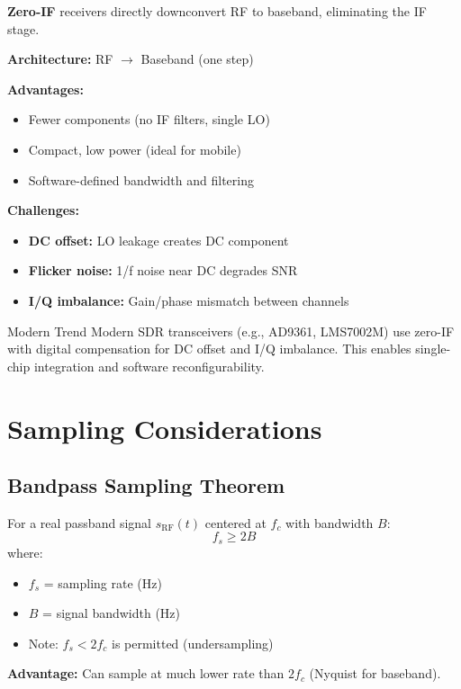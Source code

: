 \textbf{Zero-IF} receivers directly downconvert RF to baseband, eliminating the IF stage.

\textbf{Architecture:} RF $\rightarrow$ Baseband (one step)

\textbf{Advantages:}
\begin{itemize}
\item Fewer components (no IF filters, single LO)
\item Compact, low power (ideal for mobile)
\item Software-defined bandwidth and filtering
\end{itemize}

\textbf{Challenges:}
\begin{itemize}
\item \textbf{DC offset:} LO leakage creates DC component
\item \textbf{Flicker noise:} 1/f noise near DC degrades SNR
\item \textbf{I/Q imbalance:} Gain/phase mismatch between channels
\end{itemize}

\begin{calloutbox}{Modern Trend}
Modern SDR transceivers (e.g., AD9361, LMS7002M) use zero-IF with digital compensation for DC offset and I/Q imbalance. This enables single-chip integration and software reconfigurability.
\end{calloutbox}

\section{Sampling Considerations}

\subsection{Bandpass Sampling Theorem}

For a real passband signal $s_{\text{RF}}(t)$ centered at $f_c$ with bandwidth $B$:
\begin{equation}
f_s \geq 2B
\end{equation}
where:
\begin{itemize}
\item $f_s$ = sampling rate (Hz)
\item $B$ = signal bandwidth (Hz)
\item Note: $f_s < 2f_c$ is permitted (undersampling)
\end{itemize}

\textbf{Advantage:} Can sample at much lower rate than $2f_c$ (Nyquist for baseband).

